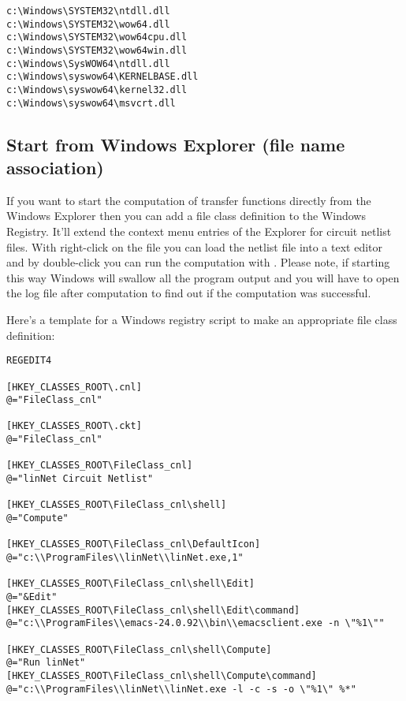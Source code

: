 \begin{verbatim}
c:\Windows\SYSTEM32\ntdll.dll
c:\Windows\SYSTEM32\wow64.dll
c:\Windows\SYSTEM32\wow64cpu.dll
c:\Windows\SYSTEM32\wow64win.dll
c:\Windows\SysWOW64\ntdll.dll
c:\Windows\syswow64\KERNELBASE.dll
c:\Windows\syswow64\kernel32.dll
c:\Windows\syswow64\msvcrt.dll
\end{verbatim}


\subsection{Start from Windows Explorer (file name association)}

If you want to start the computation of transfer functions directly from
the Windows Explorer then you can add a file class definition to the
Windows Registry. It'll extend the context menu entries of the Explorer
for circuit netlist files. With right-click on the file you can load the
netlist file into a text editor and by double-click you can run the
computation with \linnet{}. Please note, if starting \linnet{} this way
Windows will swallow all the program output and you will have to open the
log file after computation to find out if the computation was successful.

Here's a template for a Windows registry script to make an appropriate
file class definition:

{\footnotesize
\begin{verbatim}
REGEDIT4

[HKEY_CLASSES_ROOT\.cnl]
@="FileClass_cnl"

[HKEY_CLASSES_ROOT\.ckt]
@="FileClass_cnl"

[HKEY_CLASSES_ROOT\FileClass_cnl]
@="linNet Circuit Netlist"

[HKEY_CLASSES_ROOT\FileClass_cnl\shell]
@="Compute"

[HKEY_CLASSES_ROOT\FileClass_cnl\DefaultIcon]
@="c:\\ProgramFiles\\linNet\\linNet.exe,1"

[HKEY_CLASSES_ROOT\FileClass_cnl\shell\Edit]
@="&Edit"
[HKEY_CLASSES_ROOT\FileClass_cnl\shell\Edit\command]
@="c:\\ProgramFiles\\emacs-24.0.92\\bin\\emacsclient.exe -n \"%1\""

[HKEY_CLASSES_ROOT\FileClass_cnl\shell\Compute]
@="Run linNet"
[HKEY_CLASSES_ROOT\FileClass_cnl\shell\Compute\command]
@="c:\\ProgramFiles\\linNet\\linNet.exe -l -c -s -o \"%1\" %*"
\end{verbatim}
} %

